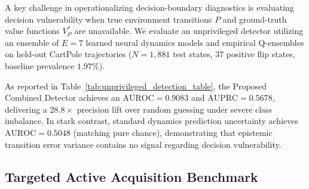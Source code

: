 \documentclass[journal,10pt,twocolumn]{IEEEtran}
\begin{document}
A key challenge in operationalizing decision-boundary diagnostics is evaluating decision vulnerability when true environment transitions $P$ and ground-truth value functions $V_P^*$ are unavailable.
We evaluate an unprivileged detector utilizing an ensemble of $E=7$ learned neural dynamics models and empirical Q-ensembles on held-out CartPole trajectories ($N = 1,881$ test states, $37$ positive flip states, baseline prevalence $1.97\%$).

\begin{table}[t]
\centering
\caption{Held-Out Unprivileged Decision-Risk Detection Benchmark ($N=1,881$ States, 2,000 Bootstrap Replicates).}
\label{tab:unprivileged_detection_table}
\end{table}

As reported in Table~\ref{tab:unprivileged_detection_table}, the Proposed Combined Detector achieves an $\text{AUROC} = 0.9083$ and $\text{AUPRC} = 0.5678$, delivering a $28.8\times$ precision lift over random guessing under severe class imbalance. In stark contrast, standard dynamics prediction uncertainty achieves $\text{AUROC} = 0.5048$ (matching pure chance), demonstrating that epistemic transition error variance contains no signal regarding decision vulnerability.

\subsection{Targeted Active Acquisition Benchmark}
\label{subsec:active_acquisition_benchmark}
\end{document}
